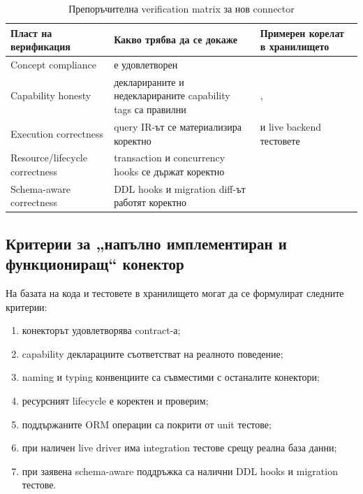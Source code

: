 \begin{table}[H]
\centering
\small
\caption{Препоръчителна verification matrix за нов connector}
\label{tab:connector_verification_matrix}
\begin{tabularx}{\textwidth}{L{3.0cm}L{3.3cm}Y}
\toprule
\textbf{Пласт на верификация} & \textbf{Какво трябва да се докаже} & \textbf{Примерен корелат в хранилището} \\
\midrule
Concept compliance &  е удовлетворен &  \\
Capability honesty & декларираните и недекларираните capability tags са правилни & ,  \\
Execution correctness & query IR-ът се материализира коректно &  и live backend тестовете \\
Resource/lifecycle correctness & transaction и concurrency hooks се държат коректно &  \\
Schema-aware correctness & DDL hooks и migration diff-ът работят коректно &  \\
\bottomrule
\end{tabularx}
\end{table}

\subsection{Критерии за „напълно имплементиран и функциониращ“ конектор}

На базата на кода и тестовете в хранилището могат да се формулират следните критерии:

\begin{enumerate}[label=\arabic*.]
    \item конекторът удовлетворява  contract-а;
    \item capability декларациите съответстват на реалното поведение;
    \item naming и typing конвенциите са съвместими с останалите конектори;
    \item ресурсният lifecycle е коректен и проверим;
    \item поддържаните ORM операции са покрити от unit тестове;
    \item при наличен live driver има integration тестове срещу реална база данни;
    \item при заявена schema-aware поддръжка са налични DDL hooks и migration тестове.
\end{enumerate}

